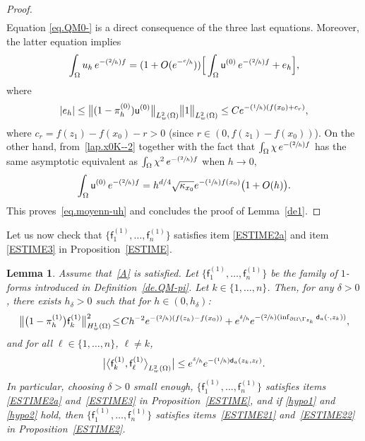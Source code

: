 \documentclass[10pt]{amsart}
\newcommand{\Psfrac}[2]{(\sfrac{#1}{#2})}
\let\lp\langle
\let\rp\rangle
\theoremstyle{plain}
\newtheorem{lemma}[proposition]{Lemma}
\theoremstyle{definition}
\begin{document}
\begin{proof}
\begin{align*}
\end{align*}
Equation \eqref{eq.QM0-} is a direct consequence of the three last equations.
Moreover, the latter equation implies\vspace*{-3pt}
\[
\int_\Omega u_h\, e^{-\Psfrac 2h f}= (1+O(e^{-\sfrac ch})) \Big[\int_\Omega \mathsf u^{(0)} \, e^{-\Psfrac 2h f}+ e_h\Big],
\]
where\vspace*{-3pt}
\[
\vert e_h\vert \le \big \Vert(1- \pi_h^{(0)}) \mathsf u^{(0)} \big \Vert_{L^2_w(\Omega)}\big \Vert1\big \Vert_{L^2_w(\Omega)}\le C e^{-\Psfrac{1}{h} (f(x_0) +c_r)},
\]
where $c_r=f(z_1)-f(x_0)-r>0$ (since $r\in (0,f(z_1)-f(x_0))$). On the other hand, from~\eqref{lap.x0K--2} together with the fact that $\int_\Omega \chi \, e^{-\Psfrac 2h f}$ has the same asymptotic equivalent as $\int_\Omega \chi^2 \, e^{-\Psfrac 2h f}$ when $h\to 0$,\vspace*{-3pt}
\[
\int_\Omega \mathsf u^{(0)} \, e^{-\Psfrac 2h f}=h^{d/4}\sqrt{\kappa_{x_0}}e^{-\Psfrac 1h f(x_0)} \bigl(1+O(h)\bigr).
\]
This proves~\eqref{eq.moyenn-uh}
and concludes the proof of Lemma~\ref{de1}.
\end{proof}

Let us now check that $\{\mathsf f_1^{(1)}, \ldots, \mathsf f_n^{(1)}\} $ satisfies item \eqref{ESTIME2a} and item \eqref{ESTIME3} in Proposition~\ref{ESTIME}.
\begin{lemma}\label{de2}
Assume that~\ref{A} is satisfied. Let $\{\mathsf f_1^{(1)}, \ldots, \mathsf f_n^{(1)}\} $ be the family of $1$\nobreakdash-forms introduced in Definition~\ref{de.QM-pi}. Let $k\in \{1,\ldots,n\}$. Then,
for any $\delta>0$,
there exists $h_\delta>0$ such that for $h\in (0,h_\delta)$:\vspace*{-3pt}
\begin{equation}\label{eq.estimePrecise-co1}
\big \| \bigl(1-\pi_h^{(1)}\bigr) \mathsf f_k^{(1)} \big \|_{H^1_{w}(\Omega)}^2 \!\le\! C h^{-2}e^{-\Psfrac 2h(f(z_k)-f(x_0))}+ e^{\sfrac{ \delta }{h}} e^{-\Psfrac 2h(\inf_{ \partial \Omega \setminus \Gamma_{z_k}} \mathsf d_a(\cdot,z_k))},
\end{equation}
and for all $\ell \in \{1,\ldots,n\}$, $\ell \neq k$,
\begin{equation}\label{eq.estimePrecise-co2}
\big\vert \big\lp\mathsf f_k^{(1)}, \mathsf f_\ell^{(1)}\big\rp_{L^2_w(\Omega)}\big\vert \le e^{\sfrac{\delta}{ h}} e^{-\Psfrac 1h \mathsf d_a(z_k,z_\ell)}.
\end{equation}
In particular, choosing $\delta>0$ small enough, $\{\mathsf f_1^{(1)}, \ldots, \mathsf f_n^{(1)}\} $ satisfies items \eqref{ESTIME2a} and~\eqref{ESTIME3} in Proposition~\ref{ESTIME}, and if \eqref{hypo1} and \eqref{hypo2} hold, then $\{\mathsf f_1^{(1)}, \ldots, \mathsf f_n^{(1)}\} $ satisfies items~\eqref{ESTIME21} and~\eqref{ESTIME22} in Proposition~\ref{ESTIME2}.
\end{lemma}
\end{document}
